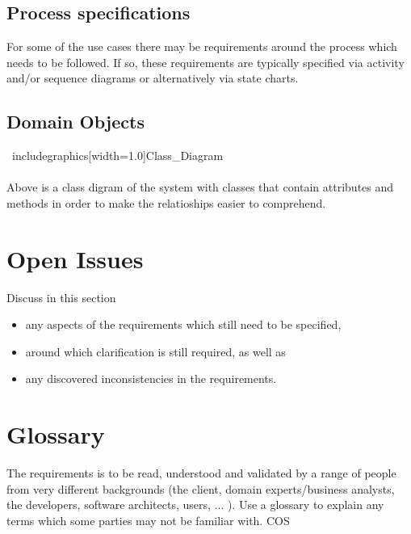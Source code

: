 \documentclass[11pt,a4paper]{article}
\begin{document}
\subsection{Process specifications}
For some of the use cases there may be requirements around the process which needs to be followed. If so, these requirements are typically specified via activity and/or sequence diagrams or
alternatively via state charts.
\subsection{Domain Objects}
\ \if includegraphics[width=1.0\linewidth]{Class_Diagram}\fi
\\\\
Above is a class digram of the system with classes that contain attributes and methods in order to make the relatioships easier to comprehend. 
\section{Open Issues}
Discuss in this section
\begin{itemize}
	\item any aspects of the requirements which still need to be specified,
	\item around which clarification is still required, as well as
	\item any discovered inconsistencies in the requirements.
\end{itemize}
\section{Glossary}
The requirements is to be read, understood and validated by a range of people from very different backgrounds (the client, domain experts/business analysts, the developers, software architects, users, ... ). Use a glossary to explain any terms which some parties may not be familiar with.
COS
\end{document}
